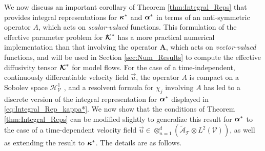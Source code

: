 \documentclass[11pt]{amsart}
\newcommand{\Ab}{\mathbf{A}}
\newcommand\Kbc{\mbox{\boldmath${\mathcal{K}}$}}
\newcommand{\Tc}{\mathcal{T}}
\newcommand{\Vc}{\mathcal{V}}
\newcommand{\Hc}{\mathcal{H}}
\newcommand{\As}{\mathscr{A}}
\newcommand\balpha{\mbox{\boldmath${\alpha}$}}
\newcommand\bkappa{\mbox{\boldmath${\kappa}$}}
\begin{document}
We now discuss an important corollary of Theorem
\ref{thm:Integral_Reps} that provides integral
representations for $\bkappa^*$ and $\balpha^*$ in terms of an
anti-symmetric operator $A$, which acts on \emph{scalar-valued}
functions. This formulation
\cite{Pavliotis:PHD_Thesis,Bhattacharya:AAP:1999:951} of the effective
parameter problem for $\Kbc^*$ has a more practical numerical
implementation than that involving the operator $\Ab$, which acts on
\emph{vector-valued} functions, and will be used in Section
\ref{sec:Num_Results} to compute the effective diffusivity tensor
$\Kbc^*$ for model flows. For the case of a time-independent,
continuously differentiable velocity field
$\vec{u}$, the operator $A$ is compact on a Sobolev space $\Hc^1_{\Vc}$
\cite{Bhattacharya:AAP:1999:951}, and a resolvent formula for $\chi_j$
involving $A$ has led to \cite{Pavliotis:PHD_Thesis} a discrete 
version of the integral representation for $\balpha^*$ displayed in 
\eqref{eq:Integral_Rep_kappa*}. We now show that the conditions of
Theorem \ref{thm:Integral_Reps} can be modified slightly to generalize
this result for $\balpha^*$ to the case of a time-dependent velocity
field $\vec{u}\in\otimes_{n=1}^d(\tilde{\As}_{\Tc}\otimes L^2(\Vc))$, as well as
extending the result to $\bkappa^*$. The details are as follows.     
\end{document}
